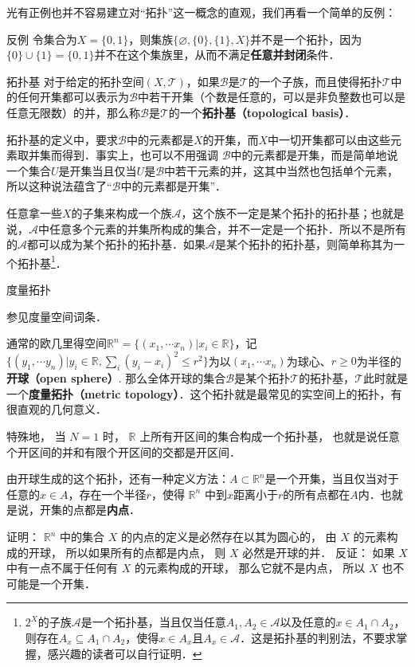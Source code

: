 光有正例也并不容易建立对“拓扑”这一概念的直观，我们再看一个简单的反例：

\begin{example}{反例}
令集合为$X=\{0, 1\}$，则集族$\{\varnothing, \{0\},\{1\}, X\}$并不是一个拓扑，因为$\{0\}\cup\{1\}=\{0,1\}$并不在这个集族里，从而不满足\textbf{任意并封闭}条件．
\end{example}

\begin{definition}{拓扑基}\label{Topol_def2}
对于给定的拓扑空间$(X, \mathcal{T})$，如果$\mathcal{B}$是$\mathcal{T}$的一个子族，而且使得拓扑$\mathcal{T}$中的任何开集都可以表示为$\mathcal{B}$中若干开集（个数是任意的，可以是非负整数也可以是任意无限数）的并，那么称$\mathcal{B}$是$\mathcal{T}$的一个\textbf{拓扑基（topological basis）}．
\end{definition}

拓扑基的定义中，要求$\mathcal{B}$中的元素都是$X$的开集，而$X$中一切开集都可以由这些元素取并集而得到．事实上，也可以不用强调
$\mathcal{B}$中的元素都是开集，而是简单地说一个集合$U$是开集当且仅当$U$是$\mathcal{B}$中若干元素的并，这其中当然也包括单个元素，所以这种说法蕴含了“$\mathcal{B}$中的元素都是开集”．

任意拿一些$X$的子集来构成一个族$\mathcal{A}$，这个族不一定是某个拓扑的拓扑基；也就是说，$\mathcal{A}$中任意多个元素的并集所构成的集合，并不一定是一个拓扑．所以不是所有的$\mathcal{A}$都可以成为某个拓扑的拓扑基．如果$\mathcal{A}$是某个拓扑的拓扑基，则简单称其为一个拓扑基\footnote{$2^X$的子族$\mathcal{A}$是一个拓扑基，当且仅当任意$A_1, A_2\in\mathcal{A}$以及任意的$x\in A_1\cap A_2$，则存在$A_x\subseteq A_1\cap A_2$，使得$x\in A_x$且$A_x\in \mathcal{A}$．这是拓扑基的判别法，不要求掌握，感兴趣的读者可以自行证明．}．


\begin{example}{度量拓扑}

参见度量空间词条．

通常的欧几里得空间$\mathbb{R}^n=\{(x_1, \cdots x_n)|x_i\in \mathbb{R}\}$，记$\{(y_1, \cdots y_n)|y_i\in \mathbb{R}, \sum_i(y_i-x_i)^2\leq r^2\}$为以$(x_1, \cdots x_n)$为球心、$r\geqslant 0$为半径的\textbf{开球（open sphere）}. 那么全体开球的集合$\mathcal{B}$是某个拓扑$\mathcal{T}$的拓扑基，$\mathcal{T}$此时就是一个\textbf{度量拓扑（metric topology）}．这个拓扑就是最常见的实空间上的拓扑，有很直观的几何意义．

特殊地， 当 $N = 1$ 时， $\mathbb R$ 上所有开区间的集合构成一个拓扑基， 也就是说任意个开区间的并和有限个开区间的交都是开区间．

由开球生成的这个拓扑，还有一种定义方法：$A\subset \mathbb{R}^n$是一个开集，当且仅当对于任意的$x\in A$，存在一个半径$r$，使得 $\mathbb R^n$ 中到$x$距离小于$r$的所有点都在$A$内．也就是说，开集的点都是\textbf{内点}．

证明： $\mathbb R^n$ 中的集合 $X$ 的内点的定义是必然存在以其为圆心的， 由 $X$ 的元素构成的开球， 所以如果所有的点都是内点， 则 $X$ 必然是开球的并． 反证： 如果 $X$ 中有一点不属于任何有 $X$ 的元素构成的开球， 那么它就不是内点， 所以 $X$ 也不可能是一个开集．
\end{example}


